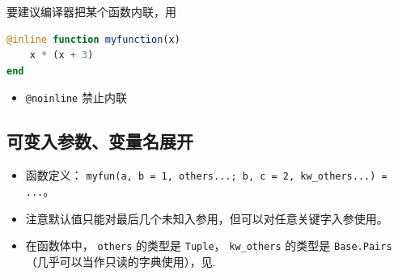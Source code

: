 要建议编译器把某个函数内联，用
\begin{lstlisting}[language=julia]
@inline function myfunction(x)
    x * (x + 3)
end
\end{lstlisting}
\begin{itemize}
\item \verb`@noinline` 禁止内联
\end{itemize}


\subsection{可变入参数、变量名展开}
\begin{itemize}
\item 函数定义： \verb`myfun(a, b = 1, others...; b, c = 2, kw_others...) = ...`。
\item 注意默认值只能对最后几个未知入参用，但可以对任意关键字入参使用。
\item 在函数体中， \verb`others` 的类型是 \verb`Tuple`， \verb`kw_others` 的类型是 \verb`Base.Pairs`（几乎可以当作只读的字典使用），见.
\end{itemize}
